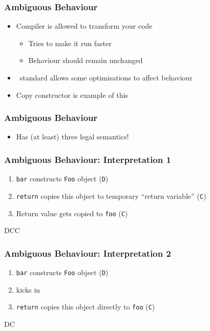 \begin{frame}
  \frametitle{Ambiguous Behaviour}
  \begin{itemize}
    \item Compiler is allowed to transform your code
          \begin{itemize}
            \item Tries to make it run faster
            \item Behaviour should remain unchanged
          \end{itemize}
    \item \cpp\ standard allows some optimisations to affect behaviour
    \item Copy constructor is example of this
  \end{itemize}
\end{frame}

\begin{frame}
  \frametitle{Ambiguous Behaviour}
  \begin{itemize}
    \item Has (at least) three legal semantics!
  \end{itemize}
\end{frame}

\begin{frame}
  \frametitle{Ambiguous Behaviour: Interpretation 1}
  \begin{enumerate}
    \item \texttt{bar} constructs \texttt{Foo} object (\texttt{D})
    \item \texttt{return} copies this object to temporary ``return variable'' (\texttt{C})
    \item Return value gets copied to \texttt{foo} (\texttt{C})
  \end{enumerate}
  \vskip5mm
  \begin{center}
    \ttfamily DCC
  \end{center}
\end{frame}

\begin{frame}
  \frametitle{Ambiguous Behaviour: Interpretation 2}
  \begin{enumerate}
    \item \texttt{bar} constructs \texttt{Foo} object (\texttt{D})
    \item {} kicks in
    \item \texttt{return} copies this object directly to \texttt{foo} (\texttt{C})
  \end{enumerate}
  \vskip5mm
  \begin{center}
    \ttfamily DC
  \end{center}
\end{frame}

